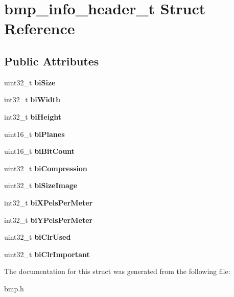 \hypertarget{structbmp__info__header__t}{}\section{bmp\+\_\+info\+\_\+header\+\_\+t Struct Reference}
\label{structbmp__info__header__t}
\subsection*{Public Attributes}
\begin{DoxyCompactItemize}
\item 
\hypertarget{structbmp__info__header__t_a6d435fadebe764049317323a36d79347}{}\label{structbmp__info__header__t_a6d435fadebe764049317323a36d79347} 
uint32\+\_\+t {\bfseries bi\+Size}
\item 
\hypertarget{structbmp__info__header__t_ac2c63241706281c4da66b69d51d43522}{}\label{structbmp__info__header__t_ac2c63241706281c4da66b69d51d43522} 
int32\+\_\+t {\bfseries bi\+Width}
\item 
\hypertarget{structbmp__info__header__t_a9ba4b93b260cc77cfa623271ea297d5e}{}\label{structbmp__info__header__t_a9ba4b93b260cc77cfa623271ea297d5e} 
int32\+\_\+t {\bfseries bi\+Height}
\item 
\hypertarget{structbmp__info__header__t_ad99b5d43c271b2466f34868a63d221ef}{}\label{structbmp__info__header__t_ad99b5d43c271b2466f34868a63d221ef} 
uint16\+\_\+t {\bfseries bi\+Planes}
\item 
\hypertarget{structbmp__info__header__t_a69abdac96ef5b1db46da7e9512a678fe}{}\label{structbmp__info__header__t_a69abdac96ef5b1db46da7e9512a678fe} 
uint16\+\_\+t {\bfseries bi\+Bit\+Count}
\item 
\hypertarget{structbmp__info__header__t_af3f1d915b9c00ee22c6904380221822b}{}\label{structbmp__info__header__t_af3f1d915b9c00ee22c6904380221822b} 
uint32\+\_\+t {\bfseries bi\+Compression}
\item 
\hypertarget{structbmp__info__header__t_a402c9fe0e4f090e2bdbc9500b5ab4433}{}\label{structbmp__info__header__t_a402c9fe0e4f090e2bdbc9500b5ab4433} 
uint32\+\_\+t {\bfseries bi\+Size\+Image}
\item 
\hypertarget{structbmp__info__header__t_ae9540b209d5024f68c814f28197157e5}{}\label{structbmp__info__header__t_ae9540b209d5024f68c814f28197157e5} 
int32\+\_\+t {\bfseries bi\+X\+Pels\+Per\+Meter}
\item 
\hypertarget{structbmp__info__header__t_af595612bafaadcff59b7c9019f26c13b}{}\label{structbmp__info__header__t_af595612bafaadcff59b7c9019f26c13b} 
int32\+\_\+t {\bfseries bi\+Y\+Pels\+Per\+Meter}
\item 
\hypertarget{structbmp__info__header__t_a73975ec158d3de017405be3d569517a3}{}\label{structbmp__info__header__t_a73975ec158d3de017405be3d569517a3} 
uint32\+\_\+t {\bfseries bi\+Clr\+Used}
\item 
\hypertarget{structbmp__info__header__t_a59803e195d2ac3ff1fe2df5bba30c05b}{}\label{structbmp__info__header__t_a59803e195d2ac3ff1fe2df5bba30c05b} 
uint32\+\_\+t {\bfseries bi\+Clr\+Important}
\end{DoxyCompactItemize}


The documentation for this struct was generated from the following file\+:\begin{DoxyCompactItemize}
\item 
bmp.\+h\end{DoxyCompactItemize}
